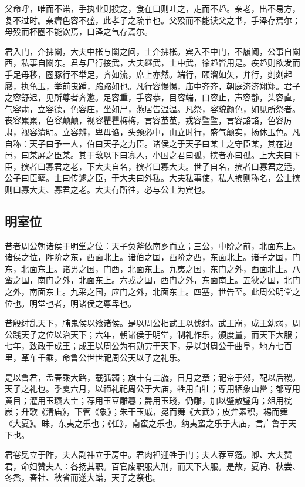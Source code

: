 \documentclass[]{article}
\begin{document}
父命呼，唯而不诺，手执业则投之，食在口则吐之，走而不趋。亲老，出不易方，复不过时。亲癠色容不盛，此孝子之疏节也。父殁而不能读父之书，手泽存焉尔；母殁而杯圈不能饮焉，口泽之气存焉尔。

君入门，介拂闑，大夫中枨与闑之间，士介拂枨。宾入不中门，不履阈，公事自闑西，私事自闑东。君与尸行接武，大夫继武，士中武，徐趋皆用是。疾趋则欲发而手足毋移，圈豚行不举足，齐如流，席上亦然。端行，颐溜如矢，弁行，剡剡起屦，执龟玉，举前曳踵，蹜蹜如也。凡行容愓愓，庙中齐齐，朝庭济济翔翔。君子之容舒迟，见所尊者齐遬。足容重，手容恭，目容端，口容止，声容静，头容直，气容肃，立容德，色容庄，坐如尸，燕居告温温。凡祭，容貌颜色，如见所祭者。丧容累累，色容颠颠，视容瞿瞿梅梅，言容茧茧，戎容暨暨，言容詻詻，色容厉肃，视容清明。立容辨，卑毋谄，头颈必中，山立时行，盛气颠实，扬休玉色。凡自称：天子曰予一人，伯曰天子之力臣。诸侯之于天子曰某土之守臣某，其在边邑，曰某屏之臣某。其于敌以下曰寡人，小国之君曰孤，摈者亦曰孤。上大夫曰下臣，摈者曰寡君之老，下大夫自名，摈者曰寡大夫。世子自名，摈者曰寡君之适，公子曰臣孽。士曰传遽之臣，于大夫曰外私。大夫私事使，私人摈则称名，公士摈则曰寡大夫、寡君之老。大夫有所往，必与公士为宾也。

\hypertarget{header-n470}{%
\subsection{明室位}\label{header-n470}}

昔者周公朝诸侯于明堂之位：天子负斧依南乡而立；三公，中阶之前，北面东上。诸侯之位，阼阶之东，西面北上。诸伯之国，西阶之西，东面北上。诸子之国，门东，北面东上。诸男之国，门西，北面东上。九夷之国，东门之外，西面北上。八蛮之国，南门之外，北面东上。六戎之国，西门之外，东面南上。五狄之国，北门之外，南面东上。九采之国，应门之外，北面东上。四塞，世告至。此周公明堂之位也。明堂也者，明诸侯之尊卑也。

昔殷纣乱天下，脯鬼侯以飨诸侯。是以周公相武王以伐纣。武王崩，成王幼弱，周公践天子之位以治天下；六年，朝诸侯于明堂，制礼作乐，颁度量，而天下大服；七年，致政于成王；成王以周公为有勋劳于天下，是以封周公于曲阜，地方七百里，革车千乘，命鲁公世世祀周公天以子之礼乐。

是以鲁君，孟春乘大路，载弧韣；旗十有二旒，日月之章；祀帝于郊，配以后稷。天子之礼也。季夏六月，以禘礼祀周公于大庙，牲用白牡；尊用牺象山罍；郁尊用黄目；灌用玉瓒大圭；荐用玉豆雕篹；爵用玉琖，仍雕，加以璧散璧角；俎用梡嶡；升歌《清庙》，下管《象》；朱干玉戚，冕而舞《大武》；皮弁素积，裼而舞《大夏》。昧，东夷之乐也；《任》，南蛮之乐也。纳夷蛮之乐于大庙，言广鲁于天下也。

君卷冕立于阼，夫人副袆立于房中。君肉袒迎牲于门；夫人荐豆笾。卿、大夫赞君，命妇赞夫人：各扬其职。百官废职服大刑，而天下大服。是故，夏礿、秋尝、冬烝，春社、秋省而遂大蜡，天子之祭也。
\end{document}
